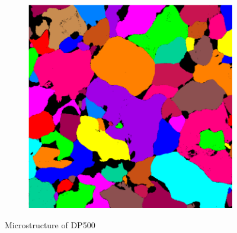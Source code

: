 \documentclass{article}
\begin{document}
\begin{figure}[h!]
\begin{subfigure}[b]{0.3\textwidth}
         \caption{}
         \label{fig:Micro2_500}
     \end{subfigure}
          \hfill
     \begin{subfigure}[b]{0.3\textwidth}
         \centering
         \includegraphics[width=\textwidth]{Micro3_500.png}
         \caption{}
         \label{fig:Micro3_500}
     \end{subfigure}
     \caption{Microstructure of DP500}
     \label{fig:Micro_500}
\end{figure}
\end{document}
